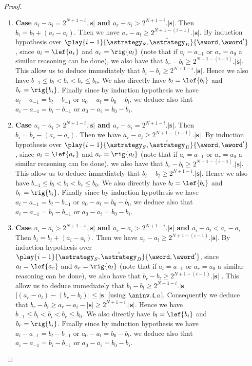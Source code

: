 \begin{proof}
\begin{enumerate}
\item \textbf{Case $a_i-a_l = 2^{N+1-i}.|\mathbf{s}|$ and $a_r-a_i > 2^{N+1-i}.|\mathbf{s}|$}. Then $b_i=b_l+(a_i-a_l)$. Then we have $a_r-a_l \geq 2^{N+1-(i-1)}.|\mathbf{s}|$. By induction hypothesis over $\play{i-1}{\astrategy_S,\hat\astrategy_D}{\aword,\aword'}$, since $a_l=\lef{a_r}$ and $a_r=\rig{a_l}$ (note that if $a_l=a_{-1}$ or $a_r=a_0$ a similar reasoning can be done),  we also have that  $b_r-b_l \geq  2^{N+1-(i-1)}.|\mathbf{s}|$. This allow us to deduce immediately that  $b_r-b_i \geq 2^{N+1-i}.|\mathbf{s}|$. Hence we also have  $b_{-1} \leq b_l < b_i < b_r \leq b_0$. We also directly have $b_l=\lef{b_i}$ and $b_r=\rig{b_i}$. Finally since by induction hypothesis we have $a_{l}-a_{-1}=b_{l}-b_{-1}$ or $a_{0}-a_{l}=b_{0}-b_{l}$, we deduce also that $a_{i}-a_{-1}=b_{i}-b_{-1}$ or $a_{0}-a_{i}=b_{0}-b_{i}$.
\item \textbf{Case $a_i-a_l > 2^{N+1-i}.|\mathbf{s}|$ and $a_r-a_i = 2^{N+1-i}.|\mathbf{s}|$}. Then $b_i=b_r-(a_r-a_i)$. Then we have $a_r-a_l \geq 2^{N+1-(i-1)}.|\mathbf{s}|$. By induction hypothesis over $\play{i-1}{\astrategy_S,\hat\astrategy_D}{\aword,\aword'}$, since $a_l=\lef{a_r}$ and $a_r=\rig{a_l}$ (note that if $a_l=a_{-1}$ or $a_r=a_0$ a similar reasoning can be done),  we also have that  $b_r-b_l \geq  2^{N+1-(i-1)}.|\mathbf{s}|$. This allow us to deduce immediately that  $b_i-b_l \geq 2^{N+1-i}.|\mathbf{s}|$. Hence we also have  $b_{-1} \leq b_l < b_i < b_r \leq b_0$. We also directly have $b_l=\lef{b_i}$ and $b_r=\rig{b_i}$. Finally since by induction hypothesis we have $a_{l}-a_{-1}=b_{l}-b_{-1}$ or $a_{0}-a_{l}=b_{0}-b_{l}$, we deduce also that $a_{i}-a_{-1}=b_{i}-b_{-1}$ or $a_{0}-a_{i}=b_{0}-b_{i}$.
\item \textbf{Case $a_i-a_l > 2^{N+1-i}.|\mathbf{s}|$ and $a_r-a_i > 2^{N+1-i}.|\mathbf{s}|$ and $a_i-a_l <a_r-a_i$ }. Then $b_i=b_l+(a_i-a_l)$. Then we have $a_r-a_l \geq 2^{N+1-(i-1)}.|\mathbf{s}|$. By induction hypothesis over $\play{i-1}{\astrategy_S,\hat\astrategy_D}{\aword,\aword'}$, since $a_l=\lef{a_r}$ and $a_r=\rig{a_l}$ (note that if $a_l=a_{-1}$ or $a_r=a_0$ a similar reasoning can be done),  we also have that  $b_r-b_l \geq  2^{N+1-(i-1)}.|\mathbf{s}|$ . This allow us to deduce immediately that  $b_i-b_l \geq 2^{N+1-i}.|\mathbf{s}|$ $|(a_r-a_l)-(b_r-b_l)| \leq |\mathbf{s}|$ [using $\aninv.4.a$]. Consequently we deduce that $b_r-b_i \geq a_r-a_i-|\mathbf{s}| \geq 2^{N+1-i}.|\mathbf{s}|$. Hence we have  $b_{-1} \leq b_l < b_i < b_r \leq b_0$. We also directly have $b_l=\lef{b_i}$ and $b_r=\rig{b_i}$. Finally since by induction hypothesis we have $a_{l}-a_{-1}=b_{l}-b_{-1}$ or $a_{0}-a_{l}=b_{0}-b_{l}$, we deduce also that $a_{i}-a_{-1}=b_{i}-b_{-1}$ or $a_{0}-a_{i}=b_{0}-b_{i}$.

\end{enumerate}
\end{proof}
